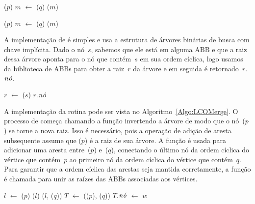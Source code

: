 \begin{algorithm}[htb]
\caption{\LCOMax($p$, $q$)}
\label{Algo:LCOMax}
\begin{algorithmic}[1]
\State \linkcutEvert($p$)
\State $m$ $\gets$ \linkcutMax($q$)
\State \Return \LCOFindNode($m$)
\end{algorithmic}
\end{algorithm}

\begin{algorithm}[htb]
\caption{\LCOMin($p$, $q$)}
\label{Algo:LCOMin}
\begin{algorithmic}[1]
\State \linkcutEvert($p$)
\State $m$ $\gets$ \linkcutMin($q$)
\State \Return \LCOFindNode($m$)
\end{algorithmic}
\end{algorithm}

A implementação de \LCOFindNode{} é simples e usa a estrutura de árvores binárias de busca com chave implícita.
Dado o nó~$s$, sabemos que ele está em alguma ABB e que a raiz dessa árvore aponta para o nó que contém~$s$ em sua ordem cíclica,
logo usamos \treapGetRoot{} da biblioteca de ABBs para obter a raiz~$r$ da árvore e em seguida é retornado~$r$.$\mathit{n\acute{o}}$.

\begin{algorithm}[htb]
\caption{\LCOFindNode($s$)}
\label{Algo:LCOFindNode}
\begin{algorithmic}[1]
\State $r$ $\gets$ \treapGetRoot($s$)
\State \Return $r$.$\mathit{n\acute{o}}$
\end{algorithmic}
\end{algorithm}


A implementação da rotina \LCOMerge{} pode ser vista no Algoritmo~\ref{Algo:LCOMerge}.
O processo de \LCOMerge{} começa chamando a função \linkcutEvert{} invertendo a árvore de modo que o nó~\treapLast($p$) se torne a nova raiz.
Isso é necessário, pois a operação \linkcutAddEdge{} de adição de aresta subsequente assume que \treapLast($p$) é a raiz de sua árvore.
A função \linkcutAddEdge{} é usada para adicionar uma aresta entre~\treapLast($p$) e~\treapFirst($q$), conectando o último nó da ordem cíclica do vértice que contém~$p$ ao primeiro nó da ordem cíclica do vértice que contém~$q$.
Para garantir que a ordem cíclica das arestas seja mantida corretamente, a função \treapJoin{} é chamada para unir as raízes das ABBs associadas aos vértices.

\begin{algorithm}[htb]
\caption{\LCOMerge($p$, $q$)}
\label{Algo:LCOMerge}
\begin{algorithmic}[1]
\State $l$ $\gets$ \treapLast($p$)
\State \linkcutEvert($l$)
\State \linkcutAddEdge($l$, \treapFirst($q$))
\State $T$ $\gets$ \treapJoin(\treapGetRoot($p$), \treapGetRoot($q$))
\State $T$.$\mathit{n\acute{o}}$ $\gets$ $w$ 
\end{algorithmic}
\end{algorithm}

